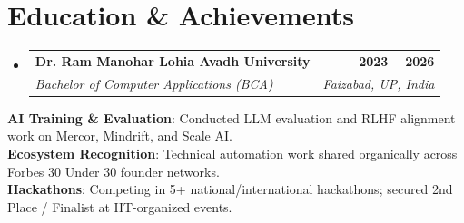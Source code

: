 \documentclass[letterpaper,11pt]{article}
\makeatletter
\newcommand{\resumeSubheading}[4]{
  \vspace{-2pt}\item
    \begin{tabular*}{1.0\textwidth}[t]{l@{\extracolsep{\fill}}r}
      \textbf{#1} & \textbf{\small #2} \\
      \textit{\small#3} & \textit{\small #4} \\
    \end{tabular*}\vspace{-7pt}
}
\newcommand{\resumeSubHeadingListStart}{\begin{itemize}[leftmargin=0.0in, label={}]}
\newcommand{\resumeSubHeadingListEnd}{\end{itemize}}
\makeatother
\begin{document}
\section{Education \& Achievements}
  \resumeSubHeadingListStart
    \resumeSubheading
      {Dr. Ram Manohar Lohia Avadh University}{2023 -- 2026}
      {Bachelor of Computer Applications (BCA)}{Faizabad, UP, India}
  \resumeSubHeadingListEnd
  \vspace{-12pt}
  \begin{itemize}[leftmargin=0.15in, label={}]
    \small{\item{
     \textbf{AI Training \& Evaluation}{: Conducted LLM evaluation and RLHF alignment work on Mercor, Mindrift, and Scale AI.} \\
     \textbf{Ecosystem Recognition}{: Technical automation work shared organically across Forbes 30 Under 30 founder networks.} \\
     \textbf{Hackathons}{: Competing in 5+ national/international hackathons; secured 2nd Place / Finalist at IIT-organized events.}
    }}
  \end{itemize}
  \vspace{-16pt}
\end{document}
